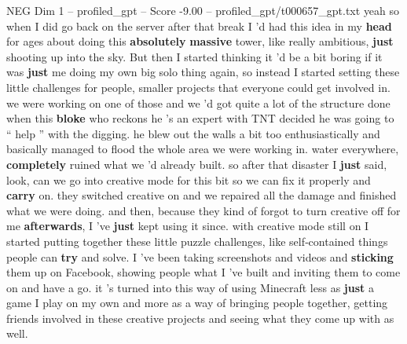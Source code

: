 \begin{textsample}{NEG Dim 1 – profiled\_gpt – Score -9.00 – profiled\_gpt/t000657\_gpt.txt}  \label{ex:f1_neg_004}
yeah so when I did go back on the server after that break I ’d had this idea in my \textbf{head} for ages about doing this \textbf{absolutely} \textbf{massive} tower, like really ambitious, \textbf{just} shooting up into the sky.
But then I started thinking it ’d be a bit boring if it was \textbf{just} me doing my own big solo thing again, so instead I started setting these little challenges for people, smaller projects that everyone could get involved in. we were working on one of those and we ’d got quite a lot of the structure done when this \textbf{bloke} who reckons he ’s an expert with TNT decided he was going to “ help ” with the digging. he blew out the walls a bit too enthusiastically and basically managed to flood the whole area we were working in. water everywhere, \textbf{completely} ruined what we ’d already built. so after that disaster I \textbf{just} said, look, can we go into creative mode for this bit so we can fix it properly and \textbf{carry} on. they switched creative on and we repaired all the damage and finished what we were doing. and then, because they kind of forgot to turn creative off for me \textbf{afterwards}, I ’ve \textbf{just} kept using it since. with creative mode still on I started putting together these little puzzle challenges, like self‑contained things people can \textbf{try} and solve.
I ’ve been taking screenshots and videos and \textbf{sticking} them up on Facebook, showing people what I ’ve built and inviting them to come on and have a go. it ’s turned into this way of using Minecraft less as \textbf{just} a game I play on my own and more as a way of bringing people together, getting friends involved in these creative projects and seeing what they come up with as well.

\end{textsample}
